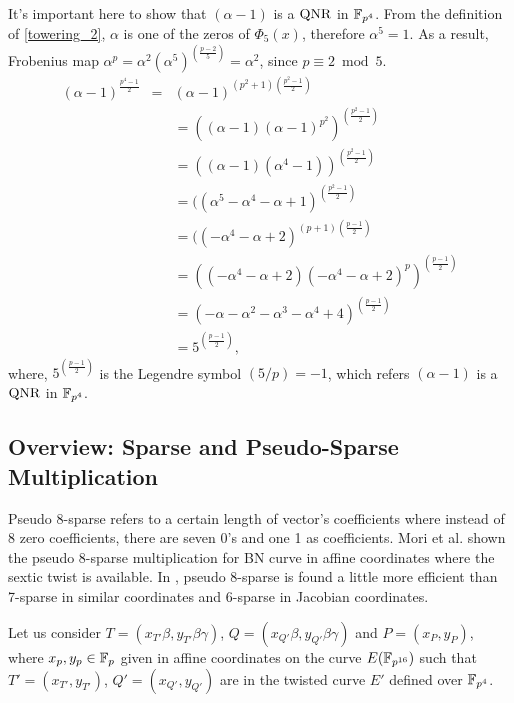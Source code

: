 It's important here to show that $(\alpha-1)$ is a $\mbox{QNR}$ in $\mathbb{F}_{p^4}$. 
From the definition of \eqref{towering_2}, $\alpha$ is one of the zeros of $\Phi_{5}(x)$, therefore $\alpha^5=1$.
As a result, Frobenius map $\alpha^p = \alpha^2(\alpha^5)^{(\frac{p-2}{5})}=\alpha^2$, since $p \equiv 2 \bmod 5$.
\begin{eqnarray}
(\alpha-1)^{\frac{p^4-1}{2}} & = & (\alpha-1)^{(p^2+1)(\frac{p^2-1}{2})} \nonumber \\
& & = ((\alpha-1)(\alpha-1)^{p^2})^{(\frac{p^2-1}{2})} \nonumber \\
& & = ((\alpha-1)(\alpha^4-1))^{(\frac{p^2-1}{2})} \nonumber \\
& & = ((\alpha^5-\alpha^4-\alpha+1)^{(\frac{p^2-1}{2})} \nonumber \\
& & = ((-\alpha^4-\alpha+2)^{(p+1)(\frac{p-1}{2})}  \nonumber \\
& & = ((-\alpha^4-\alpha+2)(-\alpha^4-\alpha+2)^p)^{(\frac{p-1}{2})}  \nonumber \\
& & = (-\alpha-\alpha^2-\alpha^3-\alpha^4+4)^{(\frac{p-1}{2})}  \nonumber \\
& & =5^{(\frac{p-1}{2})},  \nonumber
\end{eqnarray}
where, $5^{(\frac{p-1}{2})}$ is the Legendre symbol $(5/p) = -1$, which refers $(\alpha-1)$ is a $\mbox{QNR}$ in $\mathbb{F}_{p^4}$.

\subsection{Overview: Sparse and Pseudo-Sparse Multiplication}
Pseudo 8-sparse refers to a certain length of vector's coefficients where instead of 8 zero coefficients, there are seven  0's and one 1 as coefficients.
Mori et al. \cite{PAIRING:MANS13}  shown the pseudo 8-sparse multiplication for BN curve in affine coordinates where the sextic twist is available. In \cite{PAIRING:MANS13}, pseudo 8-sparse is found a little more efficient than 7-sparse in similar coordinates and 6-sparse in Jacobian coordinates. 

Let us consider  $T=(x_{T'} \beta, y_{T'} \beta \gamma)$, $Q=(x_{Q'} \beta, y_{Q'}\beta \gamma)$  and  $P=(x_P,y_P) $, where $x_p, y_p \in {\mathbb{F}}_{p}$ given in affine coordinates on the curve $E(\mathbb{F}_{p^{16}})$ such that $T'=(x_{T'},y_{T'})$, $Q'=(x_{Q'},y_{Q'})$ are in the twisted curve $E'$ defined over $\mathbb{F}_{p^4}$.

